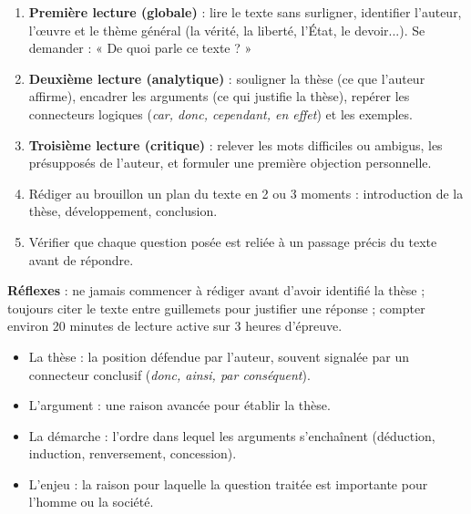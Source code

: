 \documentclass[11pt]{article}
\newcommand{\cle}[1]{{\popxbold\color{popdark}#1}}
\begin{document}
\begin{methode}
\begin{enumerate}
\item \textbf{Première lecture (globale)} : lire le texte sans surligner, identifier l'auteur, l'œuvre et le thème général (la vérité, la liberté, l'État, le devoir...). Se demander : « De quoi parle ce texte ? »
\item \textbf{Deuxième lecture (analytique)} : souligner la \cle{thèse} (ce que l'auteur affirme), encadrer les \cle{arguments} (ce qui justifie la thèse), repérer les connecteurs logiques (\emph{car, donc, cependant, en effet}) et les exemples.
\item \textbf{Troisième lecture (critique)} : relever les mots difficiles ou ambigus, les présupposés de l'auteur, et formuler une première objection personnelle.
\item Rédiger au brouillon un plan du texte en 2 ou 3 moments : introduction de la thèse, développement, conclusion.
\item Vérifier que chaque question posée est reliée à un passage précis du texte avant de répondre.
\end{enumerate}
\textbf{Réflexes} : ne jamais commencer à rédiger avant d'avoir identifié la thèse ; toujours citer le texte entre guillemets pour justifier une réponse ; compter environ 20 minutes de lecture active sur 3 heures d'épreuve.
\end{methode}

\begin{aretenir}
\begin{itemize}
\item La \cle{thèse} : la position défendue par l'auteur, souvent signalée par un connecteur conclusif (\emph{donc, ainsi, par conséquent}).
\item L'\cle{argument} : une raison avancée pour établir la thèse.
\item La \cle{démarche} : l'ordre dans lequel les arguments s'enchaînent (déduction, induction, renversement, concession).
\item L'\cle{enjeu} : la raison pour laquelle la question traitée est importante pour l'homme ou la société.
\end{itemize}
\end{aretenir}
\end{document}
